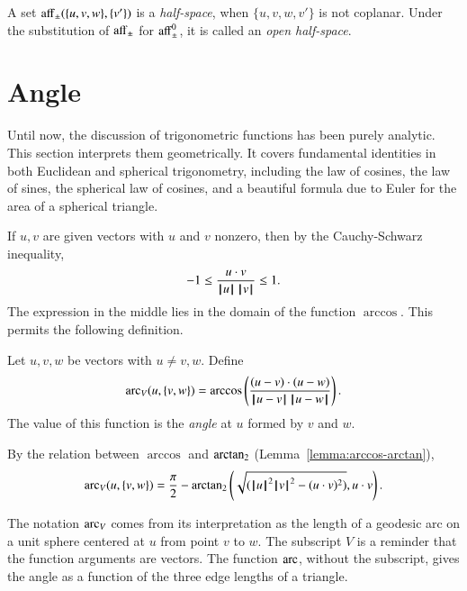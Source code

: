 \begin{definition} A set ${\operatorname{aff}}_{\pm}(\{u,v,w\},\{v'\})$ is a {\it half-space},
when $\{u,v,w,v'\}$ is not coplanar.  Under the substitution of
${\operatorname{aff}}_{\pm}$ for ${\operatorname{aff}}_{\pm}^0$, it is called an
{\it open half-space}.
\end{definition}

\section{Angle}\label{sec:angle}

Until now, the discussion of trigonometric functions has been purely analytic.  This section
interprets them geometrically.
It covers fundamental identities
in both Euclidean and spherical trigonometry, including the law
of cosines, the law of sines, the spherical law of cosines, 
and a beautiful formula due to Euler for
the area of a spherical triangle.

If $u,v$ are given vectors with $u$ and $v$ nonzero, then by the
Cauchy-Schwarz inequality,
    $$-1 \le \frac{u\cdot v}{{{\hskip0.1em|\hskip-0.15em|\hskip0.1em}u{\hskip0.1em|\hskip-0.15em|\hskip0.1em}}\,{{\hskip0.1em|\hskip-0.15em|\hskip0.1em}v{\hskip0.1em|\hskip-0.15em|\hskip0.1em}}} \le 1.$$
The expression in the middle lies in the domain of the function $\arccos$. This permits the following definition.

\begin{definition}\label{def:angle}
Let $u,v,w$ be vectors with $u\ne v,w$.
Define
    $$
    \operatorname{arc}_V(u,\{v,w\}) = \arccos\left(\frac{(u-v)\cdot (u-w)}{{\hskip0.1em|\hskip-0.15em|\hskip0.1em}u - v{\hskip0.1em|\hskip-0.15em|\hskip0.1em}\,{\hskip0.1em|\hskip-0.15em|\hskip0.1em}u - w{\hskip0.1em|\hskip-0.15em|\hskip0.1em}}\right).
    $$
The value of this function is the {\it angle} at $u$ formed by $v$ and $w$.
\end{definition}

By the relation between $\arccos$ and ${\operatorname{arctan_2}}$
(Lemma~\ref{lemma:arccos-arctan}), %
    \begin{equation}\label{eqn:angle}
    \operatorname{arc}_V(u,\{v,w\}) = \frac{\pi}2 - {\operatorname{arctan_2}}\left ({\sqrt{({{\hskip0.1em|\hskip-0.15em|\hskip0.1em}u{\hskip0.1em|\hskip-0.15em|\hskip0.1em}}^2{{\hskip0.1em|\hskip-0.15em|\hskip0.1em}v{\hskip0.1em|\hskip-0.15em|\hskip0.1em}}^2 -
    (u\cdot v)^2)}}, {u\cdot v}\right).
    \end{equation}

The notation $\operatorname{arc}_V$ comes from its interpretation as the
length of a geodesic arc on a unit sphere
centered at $u$ from point $v$ to $w$.
The subscript $V$ is a reminder that
the function arguments are vectors.  The function
$\operatorname{arc}$, without the subscript,  gives the angle as a function
of the three edge lengths of a triangle.

